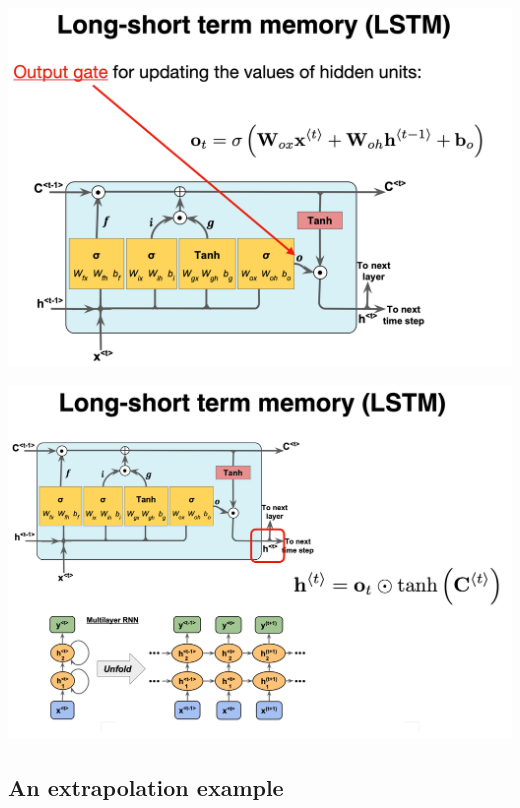 \documentclass[%
oneside,                 %
final,                   %
10pt]{article}
\begin{document}
\vspace{6mm}

\vspace{6mm}

\centerline{\includegraphics[width=0.9\linewidth]{figslides/RNN21.png}}

\vspace{6mm}

\vspace{6mm}

\centerline{\includegraphics[width=0.9\linewidth]{figslides/RNN22.png}}

\vspace{6mm}

\subsection{An extrapolation example}
\end{document}
